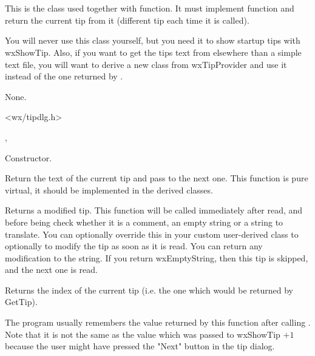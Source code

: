 \section{}\label{wxtipprovider}

This is the class used together with  function.
It must implement  function and return the
current tip from it (different tip each time it is called).

You will never use this class yourself, but you need it to show startup tips
with wxShowTip. Also, if you want to get the tips text from elsewhere than a
simple text file, you will want to derive a new class from wxTipProvider and
use it instead of the one returned by .


None.


<wx/tipdlg.h>


, 


\label{wxtipproviderctor}


Constructor.


\label{wxtipprovidergettip}


Return the text of the current tip and pass to the next one. This function is
pure virtual, it should be implemented in the derived classes.

\label{wxtipproviderpreprocesstip}

Returns a modified tip. This function will be called immediately after read,
and before being check whether it is a comment, an empty string or a string 
to translate. You can optionally override this in your custom user-derived class 
to optionally to modify the tip as soon as it is read. You can return any 
modification to the string. If you return wxEmptyString, then this tip is 
skipped, and the next one is read.

\label{wxtipprovidergetcurrenttip}


Returns the index of the current tip (i.e. the one which would be returned by 
GetTip).

The program usually remembers the value returned by this function after calling 
. Note that it is not the same as the value which
was passed to wxShowTip $+ 1$ because the user might have pressed the "Next"
button in the tip dialog.

